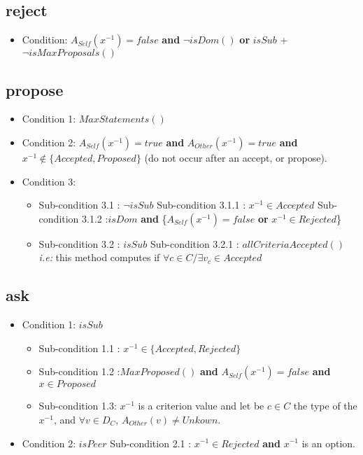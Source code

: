 \documentclass{article}
\begin{document}
	\subsection{reject}
	\begin{itemize}
		\item Condition: $A_{Self} (x^{-1}) = false$ \textbf{and}
		\subitem $\neg isDom()$ 
		\subitem \textbf{or}
		\subitem $isSub$ + $\neg isMaxProposals()$
	\end{itemize}
	
	\subsection{propose}
	\begin{itemize}
		\item Condition 1: $MaxStatements()$
		
		\item Condition 2: $A_{Self} (x^{-1}) = true$ \textbf{and}
		$A_{Other} (x^{-1}) = true$ 
		\textbf{and}
		\\ $x^{-1} \notin \{Accepted,Proposed\}$ (do not occur after an accept, or propose).
		
		\item Condition 3: 
		\begin{itemize}
			\item Sub-condition 3.1 : $\neg isSub$ 
			\subitem  Sub-condition 3.1.1 : $x^{-1} \in {Accepted}$
			\subitem Sub-condition 3.1.2 :$ isDom $  \textbf{ and }  \{$A_{Self} (x^{-1}) = false$ \textbf{ or }  $x^{-1} \in {Rejected}$\}
			\item Sub-condition 3.2 : $ isSub$
			\subitem Sub-condition 3.2.1 : $allCriteriaAccepted()$ \emph{i.e:} this method computes if $ \forall c \in C / \exists v_c \in Accepted$ 
		\end{itemize}	
		
	\end{itemize}
	
	\subsection{ask}
	\begin{itemize}
		
		\item Condition 1:  $isSub$ 
		\begin{itemize}
			\item  Sub-condition 1.1 : $x^{-1} \in \{Accepted, Rejected\}$
			\item Sub-condition 1.2 :$ MaxProposed() $  \textbf{ and }  $A_{Self} (x^{-1}) = false$ \textbf{ and } $x \in Proposed$
			\item Sub-condition 1.3: $x^{-1}$ is a criterion value and let be $c \in C$ the type of the $x^{-1}$, and $\forall v \in D_C$, $ A_{Other}(v) \not = Unkown$.
			
		\end{itemize}
		\item Condition 2: $isPeer$ 
		\subitem Sub-condition 2.1 : $x^{-1} \in {Rejected}$ \textbf{ and } $x^{-1}$ is an option.
	\end{itemize}
	
\end{document}
